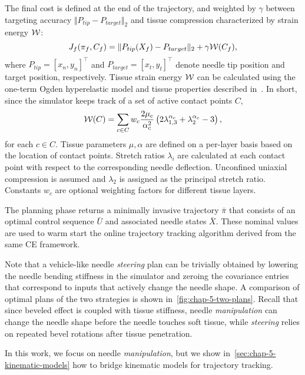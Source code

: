 The final cost is defined at the end of the trajectory, and weighted by $\gamma$ between targeting accuracy $\Vert P_{tip} - P_{target}\Vert_2$ and tissue compression characterized by strain energy $\mathcal{W}$:
\begin{equation}
  \label{eq:chap-5-plan-final-cost}
  J_{f}(\pi_f, C_f)= \Vert P_{tip}(X_f) - P_{target}\Vert_2 + \gamma\mathcal{W}(C_f),
\end{equation}
where $P_{tip} = [x_n, y_n]^{\top}$ and $P_{target} = [x_t, y_t]^{\top}$ denote needle tip position and target position, respectively. Tissue strain energy $\mathcal{W}$ can be calculated using the one-term Ogden hyperelastic model and tissue properties described in~\parencite{wangFlexibleNeedleBending2023}. In short, since the simulator keeps track of a set of active contact points $C$,
\begin{equation}
  \label{eq:chap-5-ogden}
  \mathcal{W}(C) = \sum_{c \in C}w_c \frac{2\mu_c}{\alpha_c^2}\left( 2\lambda_{1,3}^{\alpha_c} + \lambda_2^{\alpha_c} - 3 \right),
\end{equation}
for each $c \in C$. Tissue parameters $\mu, \alpha$ are defined on a per-layer basis based on the location of contact points. Stretch ratios $\lambda_i$ are calculated at each contact point with respect to the corresponding needle deflection. Unconfined uniaxial compression is assumed and $\lambda_2$ is assigned as the principal stretch ratio. Constants $w_c$ are optional weighting factors for different tissue layers.

The planning phase returns a minimally invasive trajectory $\bar{\pi}$ that consists of an optimal control sequence $\bar{U}$ and associated needle states $\bar{X}$. These nominal values are used to warm start the online trajectory tracking algorithm derived from the same CE framework. 

Note that a vehicle-like needle \textit{steering} plan can be trivially obtained by lowering the needle bending stiffness in the simulator and zeroing the covariance entries that correspond to inputs that actively change the needle shape. A comparison of optimal plans of the two strategies is shown in~\cref{fig:chap-5-two-plans}. Recall that since beveled effect is coupled with tissue stiffness, needle \textit{manipulation} can change the needle shape before the needle touches soft tissue, while \textit{steering} relies on repeated bevel rotations after tissue penetration.

In this work, we focus on needle \textit{manipulation}, but we show in~\cref{sec:chap-5-kinematic-models} how to bridge kinematic models for trajectory tracking.

